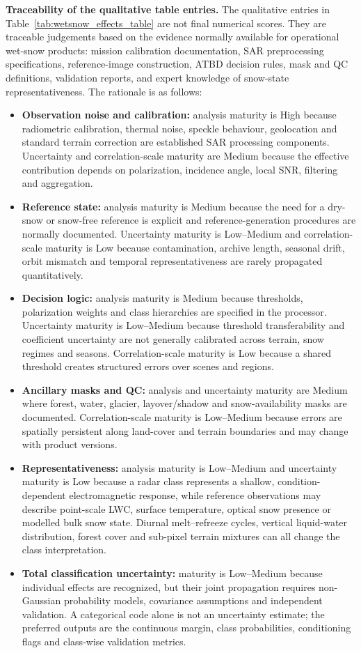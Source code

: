 \noindent\textbf{Traceability of the qualitative table entries.}
The qualitative entries in Table~\ref{tab:wetsnow_effects_table} are not final numerical scores. They are traceable judgements based on the evidence normally available for operational wet-snow products: mission calibration documentation, SAR preprocessing specifications, reference-image construction, ATBD decision rules, mask and QC definitions, validation reports, and expert knowledge of snow-state representativeness. The rationale is as follows:
\begin{itemize}
  \item \textbf{Observation noise and calibration:} analysis maturity is High because radiometric calibration, thermal noise, speckle behaviour, geolocation and standard terrain correction are established SAR processing components. Uncertainty and correlation-scale maturity are Medium because the effective contribution depends on polarization, incidence angle, local SNR, filtering and aggregation.
  \item \textbf{Reference state:} analysis maturity is Medium because the need for a dry-snow or snow-free reference is explicit and reference-generation procedures are normally documented. Uncertainty maturity is Low--Medium and correlation-scale maturity is Low because contamination, archive length, seasonal drift, orbit mismatch and temporal representativeness are rarely propagated quantitatively.
  \item \textbf{Decision logic:} analysis maturity is Medium because thresholds, polarization weights and class hierarchies are specified in the processor. Uncertainty maturity is Low--Medium because threshold transferability and coefficient uncertainty are not generally calibrated across terrain, snow regimes and seasons. Correlation-scale maturity is Low because a shared threshold creates structured errors over scenes and regions.
  \item \textbf{Ancillary masks and QC:} analysis and uncertainty maturity are Medium where forest, water, glacier, layover/shadow and snow-availability masks are documented. Correlation-scale maturity is Low--Medium because errors are spatially persistent along land-cover and terrain boundaries and may change with product versions.
  \item \textbf{Representativeness:} analysis maturity is Low--Medium and uncertainty maturity is Low because a radar class represents a shallow, condition-dependent electromagnetic response, while reference observations may describe point-scale LWC, surface temperature, optical snow presence or modelled bulk snow state. Diurnal melt--refreeze cycles, vertical liquid-water distribution, forest cover and sub-pixel terrain mixtures can all change the class interpretation.
  \item \textbf{Total classification uncertainty:} maturity is Low--Medium because individual effects are recognized, but their joint propagation requires non-Gaussian probability models, covariance assumptions and independent validation. A categorical code alone is not an uncertainty estimate; the preferred outputs are the continuous margin, class probabilities, conditioning flags and class-wise validation metrics.
\end{itemize}

